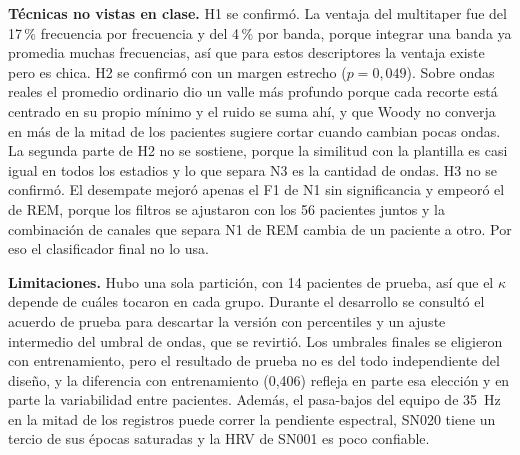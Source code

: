 \textbf{Técnicas no vistas en clase.} H1 se confirmó. La ventaja del multitaper fue del 17\,\% frecuencia por frecuencia y del 4\,\% por banda, porque integrar una banda ya promedia muchas frecuencias, así que para estos descriptores la ventaja existe pero es chica. H2 se confirmó con un margen estrecho ($p = 0{,}049$). Sobre ondas reales el promedio ordinario dio un valle más profundo porque cada recorte está centrado en su propio mínimo y el ruido se suma ahí, y que Woody no converja en más de la mitad de los pacientes sugiere cortar cuando cambian pocas ondas. La segunda parte de H2 no se sostiene, porque la similitud con la plantilla es casi igual en todos los estadios y lo que separa N3 es la cantidad de ondas. H3 no se confirmó. El desempate mejoró apenas el F1 de N1 sin significancia y empeoró el de REM, porque los filtros se ajustaron con los 56 pacientes juntos y la combinación de canales que separa N1 de REM cambia de un paciente a otro. Por eso el clasificador final no lo usa.

\textbf{Limitaciones.} Hubo una sola partición, con 14 pacientes de prueba, así que el $\kappa$ depende de cuáles tocaron en cada grupo. Durante el desarrollo se consultó el acuerdo de prueba para descartar la versión con percentiles y un ajuste intermedio del umbral de ondas, que se revirtió. Los umbrales finales se eligieron con entrenamiento, pero el resultado de prueba no es del todo independiente del diseño, y la diferencia con entrenamiento (0,406) refleja en parte esa elección y en parte la variabilidad entre pacientes. Además, el pasa-bajos del equipo de \SI{35}{\hertz} en la mitad de los registros puede correr la pendiente espectral, SN020 tiene un tercio de sus épocas saturadas y la HRV de SN001 es poco confiable.
